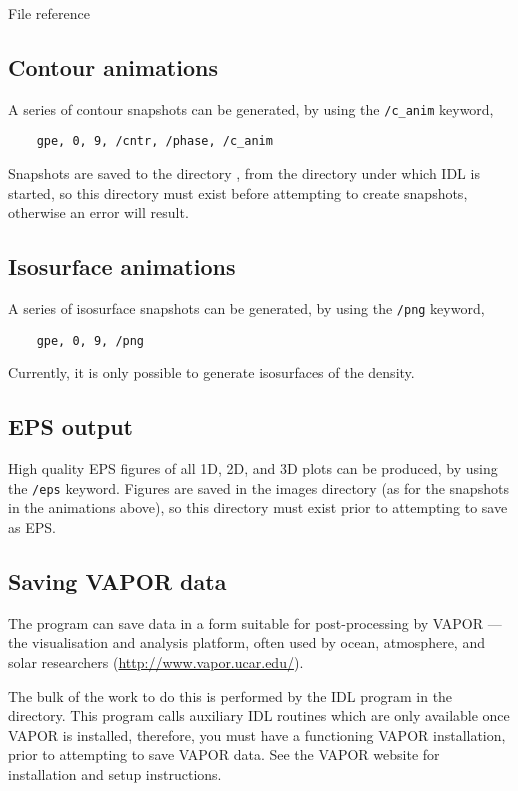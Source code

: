 \begin{chapter}{\label{cha:file_reference}File reference}
  \subsection{Contour animations}
  A series of contour snapshots can be generated, by using the \verb"/c_anim"
  keyword, \eg
  \begin{Verbatim}
    gpe, 0, 9, /cntr, /phase, /c_anim
  \end{Verbatim}
  Snapshots are saved to the directory , from the directory
  under which IDL is started, so this directory must exist before attempting to
  create snapshots, otherwise an error will result.

  \subsection{Isosurface animations}
  A series of isosurface snapshots can be generated, by using the \verb"/png"
  keyword, \eg
  \begin{Verbatim}
    gpe, 0, 9, /png
  \end{Verbatim}
  Currently, it is only possible to generate isosurfaces of the density.

  \subsection{EPS output}
  High quality EPS figures of all 1D, 2D, and 3D plots can be produced, by
  using the \verb"/eps" keyword.  Figures are saved in the images directory (as
  for the snapshots in the animations above), so this directory must exist
  prior to attempting to save as EPS.

  \subsection{Saving VAPOR data}
  The  program can save data in a form suitable for
  post-processing by VAPOR --- the visualisation and analysis platform, often
  used by ocean, atmosphere, and solar researchers
  (\url{http://www.vapor.ucar.edu/}).

  The bulk of the work to do this is performed by the IDL
   program in the  directory.
  This program calls auxiliary IDL routines which are only available once VAPOR
  is installed, therefore, you must have a functioning VAPOR installation,
  prior to attempting to save VAPOR data.  See the VAPOR website for
  installation and setup instructions.


\end{chapter}
